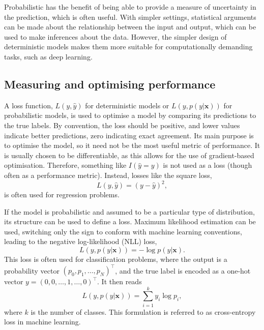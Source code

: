 Probabilistic has the benefit of being able to provide a measure of uncertainty in the prediction, which is often useful.
With simpler settings, statistical arguments can be made about the relationship between the input and output, which can be used to make inferences about the data.
However, the simpler design of deterministic models makes them more suitable for computationally demanding tasks, such as deep learning.

\subsection{Measuring and optimising performance}
A loss function, $L(y, \hat{y})$ for deterministic models or $L(y, p(y|\bm{x}))$ for probabilistic models, is used to optimise a model by comparing its predictions to the true labels.
By convention, the loss should be positive, and lower values indicate better predictions, zero indicating exact agreement.
Its main purpose is to optimise the model, so it need not be the most useful metric of performance.
It is usually chosen to be differentiable, as this allows for the use of gradient-based optimisation.
Therefore, something like $I(\hat y = y)$ is not used as a loss (though often as a performance metric).
Instead, losses like the square loss,
\begin{equation}
    L(y, \hat{y}) = (y - \hat{y})^2,
\end{equation}
is often used for regression problems.

If the model is probabilistic and assumed to be a particular type of distribution, its structure can be used to define a loss.
Maximum likelihood estimation can be used, switching only the sign to conform with machine learning conventions, leading to the negative log-likelihood (NLL) loss,
\begin{equation}
    L(y, p(y|\bm{x})) = -\log p(y|\bm{x}).
\end{equation}
This loss is often used for classification problems, where the output is a probability vector $(p_0, p_1, \dots, p_N)^\top$, and the true label is encoded as a one-hot vector $y=(0, 0, \dots, 1, \dots, 0)^\top$.
It then reads
\begin{equation}
    L(y, p(y|\bm{x})) = \sum_{i=1}^k y_i \log p_i,
\end{equation}
where $k$ is the number of classes.
This formulation is referred to as cross-entropy loss in machine learning.

